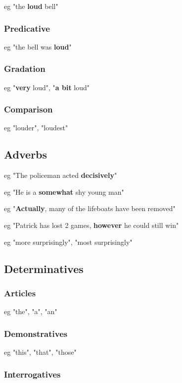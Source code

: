 eg "the \textbf{loud} bell"

\subsubsection{Predicative}

eg "the bell was \textbf{loud}"

\subsubsection{Gradation}

eg "\textbf{very} loud", "\textbf{a bit} loud"

\subsubsection{Comparison}

eg "louder", "loudest"

\subsection{Adverbs}

eg "The policeman acted \textbf{decisively}"

eg "He is a \textbf{somewhat} shy young man"

eg "\textbf{Actually}, many of the lifeboats have been removed"

eg "Patrick has lost 2 games, \textbf{however} he could still win"

eg "more surprisingly", "most surprisingly"

\subsection{Determinatives}

\subsubsection{Articles}

eg "the", "a", "an"

\subsubsection{Demonstratives}

eg "this", "that", "those"

\subsubsection{Interrogatives}

